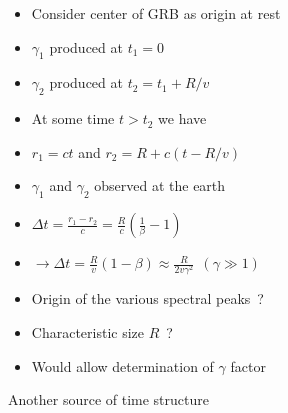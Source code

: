 \newpage

\begin{itemize}
\item Consider center of GRB as origin at rest
\item[] $\gamma_{1}$ produced at $t_{1}=0$
\item[] $\gamma_{2}$ produced at $t_{2}=t_{1}+R/v$
\item[] At some time $t>t_{2}$ we have
\item[] $r_{1}=ct$ and $r_{2}=R+c(t-R/v)$
\item $\gamma_{1}$ and $\gamma_{2}$ observed at the earth
\item[] $\displaystyle \Delta t=\frac{r_{1}-r_{2}}{c}=\frac{R}{c}\left(\frac{1}{\beta}-1\right)$
\item[] $\displaystyle \rightarrow \Delta t=\frac{R}{v}(1-\beta)
          \approx \frac{R}{2v \gamma^{2}} ~~ (\gamma \gg 1)$
\item[] {\blue Origin of the various spectral peaks~?}
\item Characteristic size $R$~?
\item[] Would allow determination of $\gamma$ factor
\end{itemize}

\Tr
\begin{center}
{\red Another source of time structure}
\end{center}

\vspace*{0.5cm}

